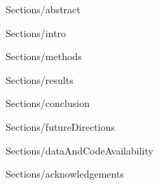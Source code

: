 \documentclass[letterpaper]{article}
\begin{document}
\maketitle

{Sections/abstract}

{Sections/intro}

{Sections/methods}

{Sections/results}

{Sections/conclusion}

{Sections/futureDirections}

{Sections/dataAndCodeAvailability}

{Sections/acknowledgements}

\footnotesize


\end{document}
